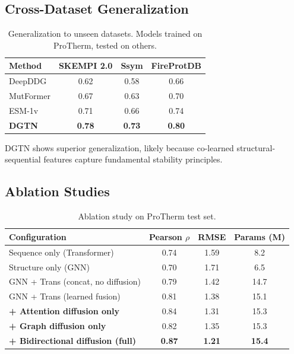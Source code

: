 \documentclass[11pt]{article}
\begin{document}
\subsection{Cross-Dataset Generalization}

\begin{table}[htbp]
\centering
\caption{Generalization to unseen datasets. Models trained on ProTherm, tested on others.}
\label{tab:generalization}
\begin{tabular}{lccc}
\toprule
\textbf{Method} & \textbf{SKEMPI 2.0} & \textbf{Ssym} & \textbf{FireProtDB} \\
\midrule
DeepDDG & 0.62 & 0.58 & 0.66 \\
MutFormer & 0.67 & 0.63 & 0.70 \\
ESM-1v & 0.71 & 0.66 & 0.74 \\
\textbf{DGTN} & \textbf{0.78} & \textbf{0.73} & \textbf{0.80} \\
\bottomrule
\end{tabular}
\end{table}

DGTN shows superior generalization, likely because co-learned structural-sequential features capture fundamental stability principles.

\subsection{Ablation Studies}

\begin{table}[htbp]
\centering
\caption{Ablation study on ProTherm test set.}
\label{tab:ablation}
\begin{tabular}{lccc}
\toprule
\textbf{Configuration} & \textbf{Pearson} $\rho$ & \textbf{RMSE} & \textbf{Params (M)} \\
\midrule
Sequence only (Transformer) & 0.74 & 1.59 & 8.2 \\
Structure only (GNN) & 0.70 & 1.71 & 6.5 \\
GNN + Trans (concat, no diffusion) & 0.79 & 1.42 & 14.7 \\
GNN + Trans (learned fusion) & 0.81 & 1.38 & 15.1 \\
\midrule
\textbf{+ Attention diffusion only} & 0.84 & 1.31 & 15.3 \\
\textbf{+ Graph diffusion only} & 0.82 & 1.35 & 15.3 \\
\textbf{+ Bidirectional diffusion (full)} & \textbf{0.87} & \textbf{1.21} & \textbf{15.4} \\
\bottomrule
\end{tabular}
\end{table}
\end{document}
